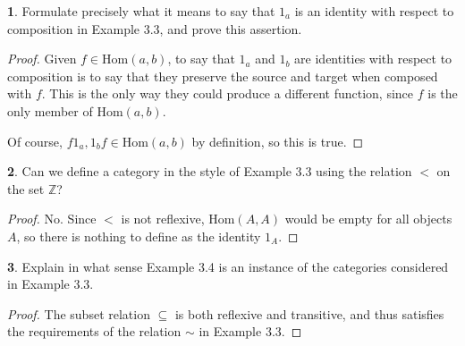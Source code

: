 \documentclass{article}
\newcounter{section-number}
\theoremstyle{definition}
\newtheorem{ex}{}[section-number]
\begin{document}
\begin{ex}
	Formulate precisely what it means to say that $1_a$ is an identity with respect to composition in Example 3.3, and prove this assertion.
\end{ex}
\begin{proof}
	Given $f \in \mathrm{Hom}(a, b)$, to say that $1_a$ and $1_b$ are identities with respect to composition is to say that they preserve the source and target when composed with $f$.
	This is the only way they could produce a different function, since $f$ is the only member of $\mathrm{Hom}(a, b)$.

	Of course, $f 1_a, 1_b f \in \mathrm{Hom}(a, b)$ by definition, so this is true.
\end{proof}

\begin{ex}
	Can we define a category in the style of Example 3.3 using the relation $<$ on the set $\mathbb{Z}$?
\end{ex}
\begin{proof}
	No.
	Since $<$ is not reflexive, $\mathrm{Hom}(A, A)$ would be empty for all objects $A$, so there is nothing to define as the identity $1_A$.
\end{proof}

\begin{ex}
	Explain in what sense Example 3.4 is an instance of the categories considered in Example 3.3.
\end{ex}
\begin{proof}
	The subset relation $\subseteq$ is both reflexive and transitive, and thus satisfies the requirements of the relation $\sim$ in Example 3.3.
\end{proof}
\end{document}
